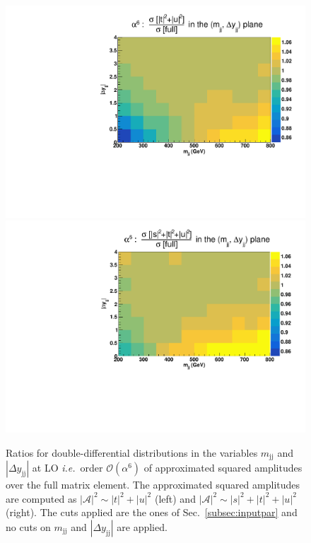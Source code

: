 \documentclass[twocolumn,epjc3]{svjour3} %
\newcommand{\Pj}{\ensuremath{\text{j}}\xspace}
\begin{document}
    \begin{figure}
    \centering
    \includegraphics[scale=0.395]{figures/scanfigures/ratio_tu.pdf}
    \includegraphics[scale=0.395]{figures/scanfigures/ratio_stu.pdf}
    \caption{Ratios for double-differential distributions in the variables $m_{\Pj\Pj}$ and $|\Delta y_{\Pj\Pj}|$ at LO \emph{i.e.}\ order $\mathcal{O}(\alpha^6)$ of approximated squared amplitudes over the full matrix element.
    The approximated squared amplitudes are computed as $|\mathcal{A}|^2 \sim |t|^2 + |u|^2$ (left) and $|\mathcal{A}|^2 \sim |s|^2 + |t|^2 + |u|^2$ (right).
    The cuts applied are the ones of Sec.~\protect\ref{subsec:inputpar} and no cuts on $m_{\Pj\Pj}$ and $|\Delta y_{\Pj\Pj}|$ are applied.} 
    \label{fig:ratio2d_LO}
    \end{figure}
    
\end{document}

